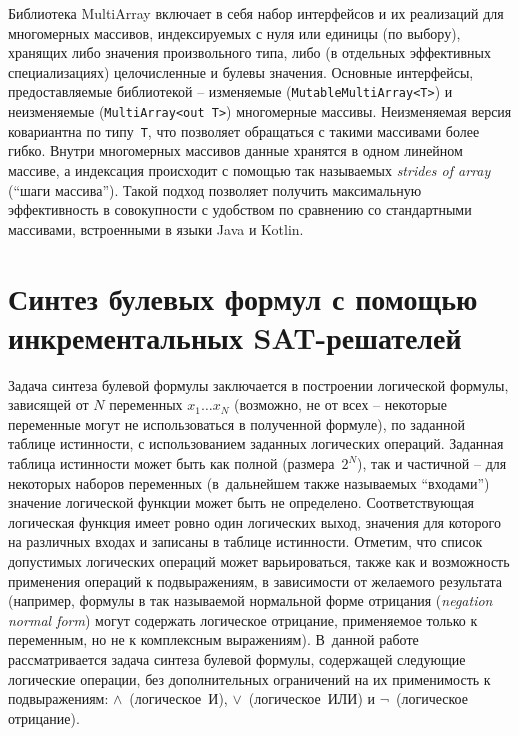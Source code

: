 Библиотека MultiArray включает в себя набор интерфейсов и их реализаций для многомерных массивов, индексируемых с нуля или единицы (по выбору), хранящих либо значения произвольного типа, либо (в отдельных эффективных специализациях) целочисленные и булевы значения.
Основные интерфейсы, предоставляемые библиотекой \--- изменяемые (\texttt{Mutable\-Multi\-Array<T>}) и неизменяемые (\texttt{Multi\-Array<out~T>}) многомерные массивы.
Неизменяемая версия ковариантна по типу~\texttt{T}, что позволяет обращаться с такими массивами более гибко.
Внутри многомерных массивов данные хранятся в одном линейном массиве, а индексация происходит с помощью так называемых \textit{strides of array} (\enquote{шаги массива}).
Такой подход позволяет получить максимальную эффективность в совокупности с удобством по сравнению со стандартными массивами, встроенными в языки Java и Kotlin.


\section{Синтез булевых формул с помощью инкрементальных SAT-решателей}
\label{sec:formula-synthesis}

Задача синтеза булевой формулы заключается в построении логической формулы, зависящей от $N$ переменных $x_{1}\ldots x_{N}$ (возможно, не от всех \--- некоторые переменные могут не использоваться в полученной формуле), по заданной таблице истинности, с использованием заданных логических операций.
Заданная таблица истинности может быть как полной (размера~$2^{N}$), так и частичной \--- для некоторых наборов переменных (в~дальнейшем также называемых \enquote{входами}) значение логической функции может быть не определено.
Соответствующая логическая функция имеет ровно один логических выход, значения для которого на различных входах и записаны в таблице истинности.
Отметим, что список допустимых логических операций может варьироваться, также как и возможность применения операций к подвыражениям, в зависимости от желаемого результата (например, формулы в так называемой нормальной форме отрицания (\textit{negation normal form}) могут содержать логическое отрицание, применяемое только к переменным, но не к комплексным выражениям).
В~данной работе рассматривается задача синтеза булевой формулы, содержащей следующие логические операции, без дополнительных ограничений на их применимость к подвыражениям: $\land$~(логическое~И), $\lor$~(логическое~ИЛИ) и $\neg$~(логическое отрицание).

